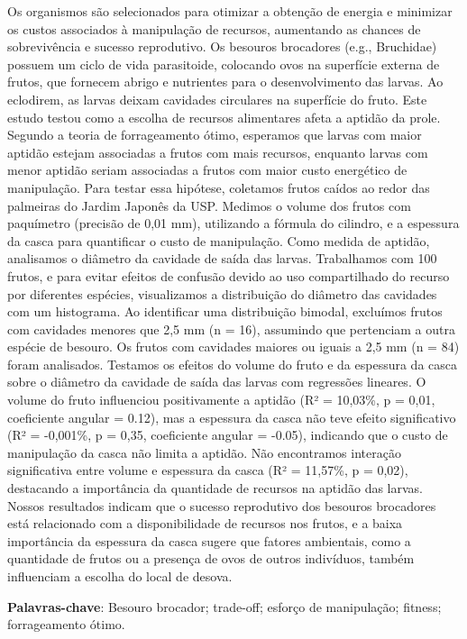 \documentclass[
]{book}
\begin{document}
Os organismos são selecionados para otimizar a obtenção de energia e minimizar os custos associados à manipulação de recursos, aumentando as chances de sobrevivência e sucesso reprodutivo. Os besouros brocadores (e.g., Bruchidae) possuem um ciclo de vida parasitoide, colocando ovos na superfície externa de frutos, que fornecem abrigo e nutrientes para o desenvolvimento das larvas. Ao eclodirem, as larvas deixam cavidades circulares na superfície do fruto. Este estudo testou como a escolha de recursos alimentares afeta a aptidão da prole. Segundo a teoria de forrageamento ótimo, esperamos que larvas com maior aptidão estejam associadas a frutos com mais recursos, enquanto larvas com menor aptidão seriam associadas a frutos com maior custo energético de manipulação. Para testar essa hipótese, coletamos frutos caídos ao redor das palmeiras do Jardim Japonês da USP. Medimos o volume dos frutos com paquímetro (precisão de 0,01 mm), utilizando a fórmula do cilindro, e a espessura da casca para quantificar o custo de manipulação. Como medida de aptidão, analisamos o diâmetro da cavidade de saída das larvas. Trabalhamos com 100 frutos, e para evitar efeitos de confusão devido ao uso compartilhado do recurso por diferentes espécies, visualizamos a distribuição do diâmetro das cavidades com um histograma. Ao identificar uma distribuição bimodal, excluímos frutos com cavidades menores que 2,5 mm (n = 16), assumindo que pertenciam a outra espécie de besouro. Os frutos com cavidades maiores ou iguais a 2,5 mm (n = 84) foram analisados. Testamos os efeitos do volume do fruto e da espessura da casca sobre o diâmetro da cavidade de saída das larvas com regressões lineares. O volume do fruto influenciou positivamente a aptidão (R² = 10,03\%, p = 0,01, coeficiente angular = 0.12), mas a espessura da casca não teve efeito significativo (R² = -0,001\%, p = 0,35, coeficiente angular = -0.05), indicando que o custo de manipulação da casca não limita a aptidão. Não encontramos interação significativa entre volume e espessura da casca (R² = 11,57\%, p = 0,02), destacando a importância da quantidade de recursos na aptidão das larvas. Nossos resultados indicam que o sucesso reprodutivo dos besouros brocadores está relacionado com a disponibilidade de recursos nos frutos, e a baixa importância da espessura da casca sugere que fatores ambientais, como a quantidade de frutos ou a presença de ovos de outros indivíduos, também influenciam a escolha do local de desova.

\textbf{Palavras-chave}: Besouro brocador; trade-off; esforço de manipulação; fitness; forrageamento ótimo.

  
\end{document}

